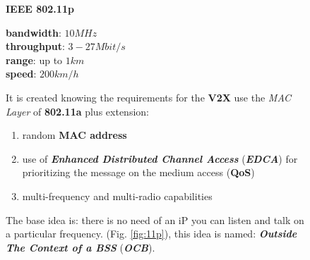 \begin{figure}[h]
\begin{minipage}[t]{0.45\textwidth}
        \begin{flushleft}
            \textbf{IEEE 802.11p} \\
            \begin{boxA}
                \centering
                \textbf{bandwidth}: $10MHz$ \\
                \textbf{throughput}: $3-27Mbit/s$ \\
                \textbf{range}: up to $1km$ \\
                \textbf{speed}: $200km/h$
            \end{boxA}
            It is created knowing the requirements for the \textbf{V2X} use the \textit{MAC Layer} of \textbf{802.11a} plus extension:
            \begin{enumerate}[nosep]
                \item random \textbf{MAC address}
                \item use of \textbf{\textit{Enhanced Distributed Channel Access}} (\textbf{\textit{EDCA}}) for prioritizing the message on the medium access (\textbf{QoS})
                \item multi-frequency and multi-radio capabilities
            \end{enumerate}
            The base idea is: there is no need of an iP you can listen and talk on a particular frequency. (Fig. \ref{fig:11p}), this idea is named: \textbf{\textit{Outside The Context of a BSS}} (\textbf{\textit{OCB}}).
        \end{flushleft}
    \end{minipage}
\end{figure}
